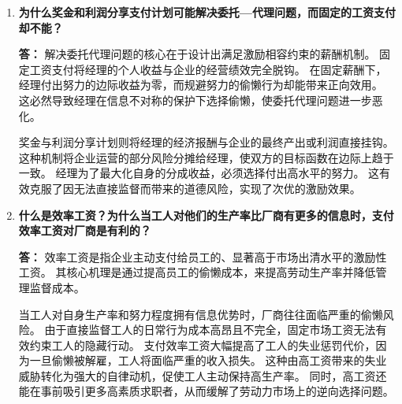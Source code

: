 \begin{enumerate}[label=\textbf{\arabic*.}, leftmargin=*]
		公共企业内部的严重信息不对称，企图赋予经理极大的自由裁量权。
		经理对企业的真实成本结构、技术细节和市场实际需求的了解远超监管官员。
		这种信息优势与缺乏硬预算约束的特性相结合，使得经理能够轻松隐瞒真实利润。
		他们倾向于将潜在利润转化为部门预算扩张、冗员配置、工作安逸度或对特定消费群体的过度补贴。
		
		\item \textbf{为什么奖金和利润分享支付计划可能解决委托—代理问题，而固定的工资支付却不能？}
		
		\textbf{答：} 解决委托代理问题的核心在于设计出满足激励相容约束的薪酬机制。
		固定工资支付将经理的个人收益与企业的经营绩效完全脱钩。
		在固定薪酬下，经理付出努力的边际收益为零，而规避努力的偷懒行为却能带来正向效用。
		这必然导致经理在信息不对称的保护下选择偷懒，使委托代理问题进一步恶化。
		
		奖金与利润分享计划则将经理的经济报酬与企业的最终产出或利润直接挂钩。
		这种机制将企业运营的部分风险分摊给经理，使双方的目标函数在边际上趋于一致。
		经理为了最大化自身的分成收益，必须选择付出高水平的努力。
		这有效克服了因无法直接监督而带来的道德风险，实现了次优的激励效果。
		
		\item \textbf{什么是效率工资？为什么当工人对他们的生产率比厂商有更多的信息时，支付效率工资对厂商是有利的？}
		
		\textbf{答：} 效率工资是指企业主动支付给员工的、显著高于市场出清水平的激励性工资。
		其核心机理是通过提高员工的偷懒成本，来提高劳动生产率并降低管理监督成本。
		
		当工人对自身生产率和努力程度拥有信息优势时，厂商往往面临严重的偷懒风险。
		由于直接监督工人的日常行为成本高昂且不完全，固定市场工资无法有效约束工人的隐藏行动。
		支付效率工资大幅提高了工人的失业惩罚代价，因为一旦偷懒被解雇，工人将面临严重的收入损失。
		这种由高工资带来的失业威胁转化为强大的自律动机，促使工人主动保持高生产率。
		同时，高工资还能在事前吸引更多高素质求职者，从而缓解了劳动力市场上的逆向选择问题。
	\end{enumerate}
	\newpage
